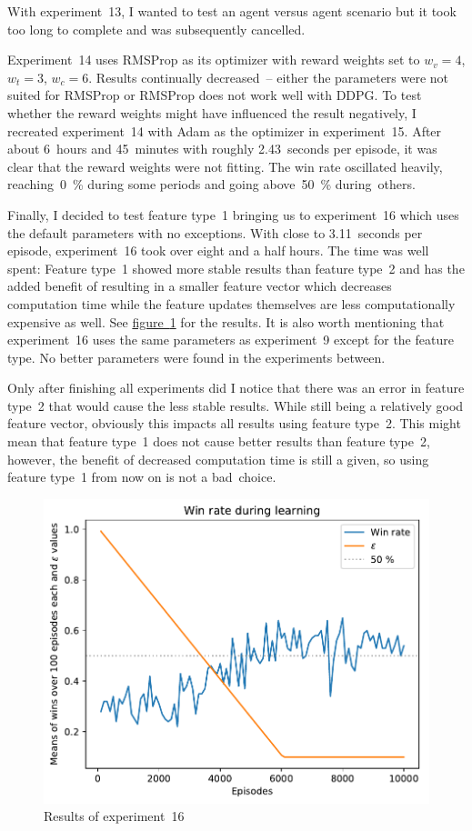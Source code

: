 \documentclass[a4paper,titlepage]{article}
\begin{document}
With experiment~13, I wanted to test an agent versus agent scenario but it took too long to complete and was subsequently cancelled.

Experiment~14 uses RMSProp as its optimizer with reward weights set to $w_v = 4$, $w_t = 3$, $w_c = 6$. Results continually decreased~-- either the parameters were not suited for RMSProp or RMSProp does not work well with DDPG. To test whether the reward weights might have influenced the result negatively, I recreated experiment~14 with Adam as the optimizer in experiment~15. After about 6~hours and 45~minutes with roughly 2.43~seconds per episode, it was clear that the reward weights were not fitting. The win rate oscillated heavily, reaching~0~\% during some periods and going above~50~\% during~others.

Finally, I decided to test feature type~1 bringing us to experiment~16  which uses the default parameters with no exceptions. With close to 3.11~seconds per episode, experiment~16 took over eight and a half hours. The time was well spent: Feature type~1 showed more stable results than feature type~2 and has the added benefit of resulting in a smaller feature vector which decreases computation time while the feature updates themselves are less computationally expensive as well. See \hyperref[fig:exp16]{figure~\ref*{fig:exp16}} for the results. It is also worth mentioning that experiment~16 uses the same parameters as experiment~9 except for the feature type. No better parameters were found in the experiments between.

Only after finishing all experiments did I notice that there was an error in feature type~2 that would cause the less stable results. While still being a relatively good feature vector, obviously this impacts all results using feature type~2. This might mean that feature type~1 does not cause better results than feature type~2, however, the benefit of decreased computation time is still a given, so using feature type~1 from now on is not a bad~choice.
\begin{figure}
  \centering
  \includegraphics[width=\textwidth]{../experiments/exp16/win_stats.pdf}
  \caption{Results of experiment~16}
  \label{fig:exp16}
\end{figure}
\end{document}
